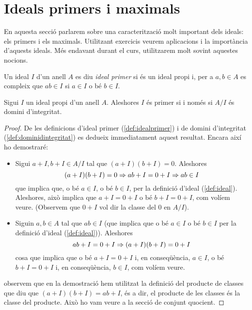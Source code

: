 \documentclass[../main.tex]{subfiles}
\begin{document}
\section{Ideals primers i maximals}

En aquesta secció parlarem sobre una caracterització molt important dels ideals: els primers i els maximals. Utilitzant exercicis veurem aplicacions i la importància d'aquests ideals. Més endavant durant el curs, utilitzarem molt sovint aquestes nocions.


\begin{defi}\label{def:idealprimer}
Un ideal $I$ d'un anell $A$ es diu \textit{ideal primer} si és un ideal propi i, per a $a,b\in A$ es compleix que $ab\in I$ si $a\in I$ o bé $b\in I$.
\end{defi}

\begin{prop}
\label{prop:primersiidi} Sigui $I$ un ideal propi d'un anell $A$. Aleshores $I$ és primer si i només si $A/I$ és domini d'integritat.
\end{prop}
\begin{proof}
De les definicions d'ideal primer (\ref{def:idealprimer}) i de domini d'integritat (\ref{def:dominidintegritat}) es dedueix immediatament aquest resultat. Encara així ho demostraré:
\begin{itemize}
    \item \fbox{$\Rightarrow$} Sigui $a+I,b+I\in A/I$ tal que $(a+I)(b+I) = 0$. Aleshores
    \begin{equation}
        \notag
        (a+I)(b+I) = 0 \Rightarrow ab+I = 0+I \Rightarrow ab\in I
    \end{equation}
    que implica que, o bé $a\in I$, o bé $b\in I$, per la definició d'ideal (\ref{def:ideal}). Aleshores, això implica que $a+I = 0+I$ o bé 
    $b+I = 0+I$, com volíem veure. (Observem que $0+I$ vol dir la classe del 0 en $A/I$).
    \item \fbox{$\Leftarrow$} Siguin $a,b\in A$ tal que $ab\in I$ (que implica que o bé $a\in I$ o bé $b\in I$ per la definició d'ideal (\ref{def:ideal})). Aleshores
    \begin{equation}
        \notag
        ab+I = 0+I \Rightarrow (a+I)(b+I) = 0+I
    \end{equation}
    cosa que implica que o bé $a+I = 0+I$ i, en conseqüència, $a\in I$, o bé $b+I = 0+I$ i, en conseqüència, $b\in I$, com volíem veure.
\end{itemize}
observem que en la demostració hem utilitzat la definició del producte de classes que diu que $(a+I)(b+I) = ab+I$, és a dir, el producte de les classes és la classe del producte. Això ho vam veure a la secció de conjunt quocient.
\end{proof}
\end{document}
